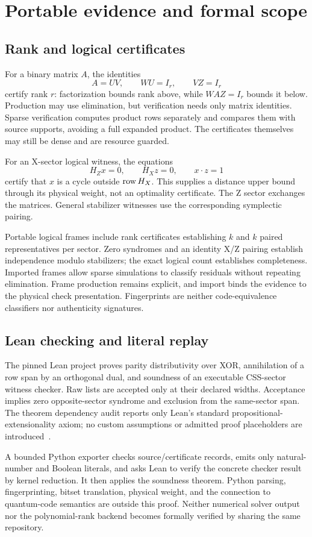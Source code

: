 \section{Portable evidence and formal scope}

\subsection{Rank and logical certificates}
For a binary matrix $A$, the identities
\begin{equation}
 A=UV,\qquad WU=I_r,\qquad VZ=I_r
\end{equation}
certify rank $r$: factorization bounds rank above, while $WAZ=I_r$ bounds
it below. Production may use elimination, but verification needs only
matrix identities. Sparse verification computes product rows separately
and compares them with source supports, avoiding a full expanded product.
The certificates themselves may still be dense and are resource guarded.

For an X-sector logical witness, the equations
\begin{equation}
 H_Zx=0,\qquad H_Xz=0,\qquad x\cdot z=1
\end{equation}
certify that $x$ is a cycle outside $\operatorname{row} H_X$. This supplies a distance
upper bound through its physical weight, not an optimality certificate.
The Z sector exchanges the matrices. General stabilizer witnesses use
the corresponding symplectic pairing.

Portable logical frames include rank certificates establishing $k$ and
$k$ paired representatives per sector. Zero syndromes and an identity
X/Z pairing establish independence modulo stabilizers; the exact logical
count establishes completeness. Imported frames allow sparse simulations
to classify residuals without repeating elimination. Frame production
remains explicit, and import binds the evidence to the physical check
presentation. Fingerprints are neither code-equivalence classifiers nor
authenticity signatures.

\subsection{Lean checking and literal replay}
The pinned Lean project proves parity distributivity over XOR, annihilation
of a row span by an orthogonal dual, and soundness of an executable
CSS-sector witness checker. Raw lists are accepted only at their declared
widths. Acceptance implies zero opposite-sector syndrome and exclusion
from the same-sector span. The theorem dependency audit reports only
Lean's standard propositional-extensionality axiom; no custom assumptions
or admitted proof placeholders are introduced~\cite{demoura2021}.

A bounded Python exporter checks source/certificate records, emits only
natural-number and Boolean literals, and asks Lean to verify the concrete
checker result by kernel reduction. It then applies the soundness theorem.
Python parsing, fingerprinting, bitset translation, physical weight, and
the connection to quantum-code semantics are outside this proof. Neither
numerical solver output nor the polynomial-rank backend becomes formally
verified by sharing the same repository.
